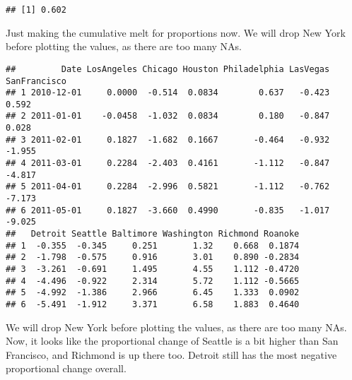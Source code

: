 \documentclass[
]{article}
\newenvironment{Shaded}{\begin{snugshade}}{\end{snugshade}}
\newcommand{\DecValTok}[1]{\textcolor[rgb]{0.00,0.00,0.81}{#1}}
\newcommand{\FunctionTok}[1]{\textcolor[rgb]{0.00,0.00,0.00}{#1}}
\newcommand{\NormalTok}[1]{#1}
\newcommand{\OtherTok}[1]{\textcolor[rgb]{0.56,0.35,0.01}{#1}}
\newcommand{\SpecialCharTok}[1]{\textcolor[rgb]{0.00,0.00,0.00}{#1}}
\begin{document}
\begin{verbatim}
## [1] 0.602
\end{verbatim}

Just making the cumulative melt for proportions now. We will drop New
York before plotting the values, as there are too many NAs.

\begin{Shaded}
\end{Shaded}

\begin{verbatim}
##         Date LosAngeles Chicago Houston Philadelphia LasVegas SanFrancisco
## 1 2010-12-01     0.0000  -0.514  0.0834        0.637   -0.423        0.592
## 2 2011-01-01    -0.0458  -1.032  0.0834        0.180   -0.847        0.028
## 3 2011-02-01     0.1827  -1.682  0.1667       -0.464   -0.932       -1.955
## 4 2011-03-01     0.2284  -2.403  0.4161       -1.112   -0.847       -4.817
## 5 2011-04-01     0.2284  -2.996  0.5821       -1.112   -0.762       -7.173
## 6 2011-05-01     0.1827  -3.660  0.4990       -0.835   -1.017       -9.025
##   Detroit Seattle Baltimore Washington Richmond Roanoke
## 1  -0.355  -0.345     0.251       1.32    0.668  0.1874
## 2  -1.798  -0.575     0.916       3.01    0.890 -0.2834
## 3  -3.261  -0.691     1.495       4.55    1.112 -0.4720
## 4  -4.496  -0.922     2.314       5.72    1.112 -0.5665
## 5  -4.992  -1.386     2.966       6.45    1.333  0.0902
## 6  -5.491  -1.912     3.371       6.58    1.883  0.4640
\end{verbatim}

We will drop New York before plotting the values, as there are too many
NAs. Now, it looks like the proportional change of Seattle is a bit
higher than San Francisco, and Richmond is up there too. Detroit still
has the most negative proportional change overall.
\end{document}
